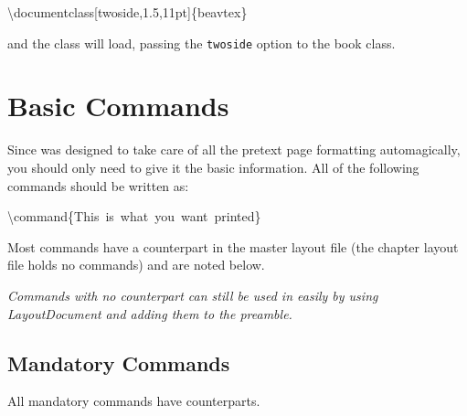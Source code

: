 \begin{lyxcode}
\textbackslash{}documentclass{[}twoside,1.5,11pt{]}\{beavtex\}
\end{lyxcode}
and the class will load, passing the \texttt{twoside} option to the
book class.


\section{Basic Commands}

Since \beavtex was designed to take care of all the pretext page
formatting automagically, you should only need to give it the basic
information. All of the following commands should be written as:

\begin{lyxcode}
\textbackslash{}command\{This~is~what~you~want~printed\}
\end{lyxcode}
Most commands have a \LyX{} counterpart in the master layout file
(the chapter layout file holds no \beavtex commands) and are noted
below.

\emph{Commands with no \LyX{} counterpart can still be used in \LyX{}
easily by using} \textsf{\emph{Layout\lyxarrow{}Document}} \emph{and
adding them to the preamble.}


\subsection{Mandatory Commands}

All mandatory commands have \LyX{} counterparts.


